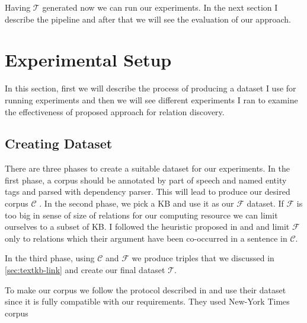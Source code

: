  Having $\mathcal{T}$ generated now we can run our experiments. In the next
 section I describe the pipeline  and after that we will see the evaluation of
 our approach.

\section{Experimental Setup}
\label{sec:textkb-exp}

In this section, first we will describe the process of producing a dataset I use
for running experiments and then we will see different experiments I ran to
examine the effectiveness of proposed approach for relation discovery.

\subsection{Creating Dataset}
\label{ssec:textkb-exp-data}

There are three phases to create a suitable dataset for our experiments. In the
first phase, a corpus should be annotated by part of speech and named entity
tags and parsed with dependency parser. This will lead to produce our desired
corpus $\mathcal{C}$ . In the second phase, we pick a KB and
use it as our $\mathcal{F}$ dataset. If $\mathcal{F}$ is too big in sense of
size of relations for our computing resource we can limit ourselves to a subset
of KB. I followed the heuristic proposed in \cite{Mintz2009} and
\cite{Riedel2013} and limit  $\mathcal{F}$ only to relations which their
argument have been co-occurred in a sentence in $\mathcal{C}$.

In the third phase, using $\mathcal{C}$ and $\mathcal{F}$ we produce triples
that we discussed in \autoref{sec:textkb-link} and create our final dataset
$\mathcal{T}$. 

To make our corpus we follow the protocol described in \cite{Riedel2013} and
use their dataset since it is fully compatible with our requirements. They used
New-York Times corpus 
